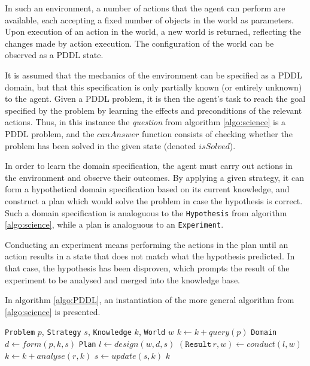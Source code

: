 \documentclass[master.tex]{subfiles}
\begin{document}
In such an environment, a number of actions that the agent can perform are available, each accepting a fixed number of objects in the world as parameters. Upon execution of an action in the world, a new world is returned, reflecting the changes made by action execution. The configuration of the world can be observed as a PDDL state.

It is assumed that the mechanics of the environment can be specified as a PDDL domain, but that this specification is only partially known (or entirely unknown) to the agent. Given a PDDL problem, it is then the agent's task to reach the goal specified by the problem by learning the effects and preconditions of the relevant actions. Thus, in this instance the \textit{question} from algorithm \ref{algo:science} is a PDDL problem, and the $canAnswer$ function consists of checking whether the problem has been solved in the given state (denoted $isSolved$).

In order to learn the domain specification, the agent must carry out actions in the environment and observe their outcomes. By applying a given strategy, it can form a hypothetical domain specification based on its current knowledge, and construct a plan which would solve the problem in case the hypothesis is correct. Such a domain specification is analoguous to the \texttt{Hypothesis} from algorithm \ref{algo:science}, while a plan is analoguous to an \texttt{Experiment}.

Conducting an experiment means performing the actions in the plan until an action results in a state that does not match what the hypothesis predicted. In that case, the hypothesis has been disproven, which prompts the result of the experiment to be analysed and merged into the knowledge base. 

In algorithm \ref{algo:PDDL}, an instantiation of the more general algorithm from \ref{algo:science} is presented.

\begin{algorithm}
    \caption{}
    \label{algo:PDDL}

    \begin{algorithmic}
         {\texttt{Problem} $p$, \texttt{Strategy} $s$, \texttt{Knowledge} $k$, \texttt{World} $w$}
                \State $k \gets k + query(p)$
                \State \texttt{Domain} $d \gets form(p, k, s)$
                \State \texttt{Plan} $l \gets design(w, d, s)$
                \State $(\texttt{Result} \, r, w) \gets conduct(l, w)$
                \State $k \gets k + analyse(r, k)$
                \State $s \gets update(s, k)$
            \EndWhile
            \State \Return $k$
        \EndFunction
    \end{algorithmic}
\end{algorithm}
\end{document}
